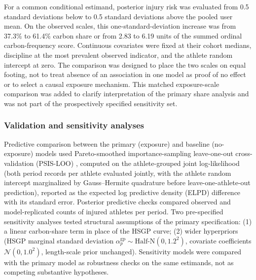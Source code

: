 For a common conditional estimand, posterior injury risk was evaluated from 0.5 standard deviations below to 0.5 standard deviations above the pooled user mean. On the observed scales, this one-standard-deviation increase was from 37.3\% to 61.4\% carbon share or from 2.83 to 6.19 units of the summed ordinal carbon-frequency score. Continuous covariates were fixed at their cohort medians, discipline at the most prevalent observed indicator, and the athlete random intercept at zero. The comparison was designed to place the two scales on equal footing, not to treat absence of an association in one model as proof of no effect or to select a causal exposure mechanism. This matched exposure-scale comparison was added to clarify interpretation of the primary share analysis and was not part of the prospectively specified sensitivity set.

\subsubsection{Validation and sensitivity analyses}
\label{sec:validation}
Predictive comparison between the primary (exposure) and baseline (no-exposure) models used Pareto-smoothed importance-sampling leave-one-out cross-validation (PSIS-LOO) \citep{vehtari2017loo}, computed on the athlete-grouped joint log-likelihood (both period records per athlete evaluated jointly, with the athlete random intercept marginalized by Gauss--Hermite quadrature before leave-one-athlete-out prediction), reported as the expected log predictive density (ELPD) difference with its standard error. Posterior predictive checks compared observed and model-replicated counts of injured athletes per period. Two pre-specified sensitivity analyses tested structural assumptions of the primary specification: (1) a linear carbon-share term in place of the HSGP curve; (2) wider hyperpriors (HSGP marginal standard deviation $\alpha^{\text{gp}}_p \sim \text{Half-N}(0, 1.2^2)$, covariate coefficients $\mathcal{N}(0, 1.0^2)$, length-scale prior unchanged). Sensitivity models were compared with the primary model as robustness checks on the same estimands, not as competing substantive hypotheses.

